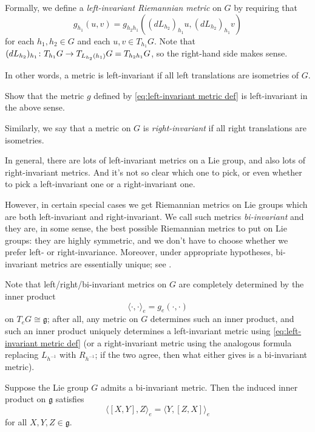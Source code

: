 Formally, we define a \emph{left-invariant Riemannian metric} on $G$ by requiring that
\[
	g_{h_1}(u,v) = g_{h_2h_1}((dL_{h_2})_{h_1}u, (dL_{h_2})_{h_1}v)
\]
for each $h_1,h_2 \in G$ and each $u,v \in T_{h_1}G$. Note that $(dL_{h_2})_{h_1} \colon\thinspace\! T_{h_1}G \to T_{L_{h_2}(h_1)}G = T_{h_2h_1}G$, so the right-hand side makes sense.

In other words, a metric is left-invariant if all left translations are isometries of $G$.

\begin{exercise}
	Show that the metric $g$ defined by \eqref{eq:left-invariant metric def} is left-invariant in the above sense.
\end{exercise}

Similarly, we say that a metric on $G$ is \emph{right-invariant} if all right translations are isometries. 

In general, there are lots of left-invariant metrics on a Lie group, and also lots of right-invariant metrics. And it's not so clear which one to pick, or even whether to pick a left-invariant one or a right-invariant one. 

However, in certain special cases we get Riemannian metrics on Lie groups which are both left-invariant and right-invariant. We call such metrics \emph{bi-invariant} and they are, in some sense, the best possible Riemannian metrics to put on Lie groups: they are highly symmetric, and we don't have to choose whether we prefer left- or right-invariance. Moreover, under appropriate hypotheses, bi-invariant metrics are essentially unique; see .

Note that left/right/bi-invariant metrics on $G$ are completely determined by the inner product
\[
	\langle \cdot , \cdot \rangle_e = g_e(\cdot , \cdot)
\]
on $T_eG \cong \mathfrak{g}$; after all, any metric on $G$ determines such an inner product, and such an inner product uniquely determines a left-invariant metric using \eqref{eq:left-invariant metric def} (or a right-invariant metric using the analogous formula replacing $L_{h^{-1}}$ with $R_{h^{-1}}$; if the two agree, then what either gives is a bi-invariant metric).

\begin{proposition}\label{prop:characterization of bi-invariant metric}
	Suppose the Lie group $G$ admits a bi-invariant metric. Then the induced inner product on $\mathfrak{g}$ satisfies
	\[
		\langle [X,Y],Z\rangle_e = \langle Y, [Z,X]\rangle_e
	\]
	for all $X,Y,Z \in \mathfrak{g}$.
\end{proposition}

